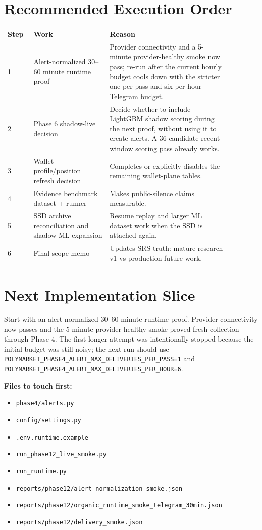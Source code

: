 \documentclass{article}
\begin{document}
\section*{Recommended Execution Order}
\begin{longtable}{p{0.10\linewidth}p{0.30\linewidth}p{0.48\linewidth}}
\textbf{Step} & \textbf{Work} & \textbf{Reason} \\
1 & Alert-normalized 30--60 minute runtime proof & Provider connectivity and a 5-minute provider-healthy smoke now pass; re-run after the current hourly budget cools down with the stricter one-per-pass and six-per-hour Telegram budget. \\
2 & Phase 6 shadow-live decision & Decide whether to include LightGBM shadow scoring during the next proof, without using it to create alerts. A 36-candidate recent-window scoring pass already works. \\
3 & Wallet profile/position refresh decision & Completes or explicitly disables the remaining wallet-plane tables. \\
4 & Evidence benchmark dataset + runner & Makes public-silence claims measurable. \\
5 & SSD archive reconciliation and shadow ML expansion & Resume replay and larger ML dataset work when the SSD is attached again. \\
6 & Final scope memo & Updates SRS truth: mature research v1 vs production future work. \\
\end{longtable}

\section*{Next Implementation Slice}
Start with an alert-normalized 30--60 minute runtime proof. Provider connectivity now passes and the 5-minute provider-healthy smoke proved fresh collection through Phase 4. The first longer attempt was intentionally stopped because the initial budget was still noisy; the next run should use \texttt{POLYMARKET\_PHASE4\_ALERT\_MAX\_DELIVERIES\_PER\_PASS=1} and \texttt{POLYMARKET\_PHASE4\_ALERT\_MAX\_DELIVERIES\_PER\_HOUR=6}.

\textbf{Files to touch first:}
\begin{itemize}[nosep]
\item \texttt{phase4/alerts.py}
\item \texttt{config/settings.py}
\item \texttt{.env.runtime.example}
\item \texttt{run\_phase12\_live\_smoke.py}
\item \texttt{run\_runtime.py}
\item \texttt{reports/phase12/alert\_normalization\_smoke.json}
\item \texttt{reports/phase12/organic\_runtime\_smoke\_telegram\_30min.json}
\item \texttt{reports/phase12/delivery\_smoke.json}
\end{itemize}
\end{document}
